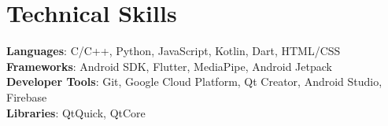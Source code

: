 \documentclass[letterpaper,11pt]{article}
\begin{document}
\section{Technical Skills}
 \begin{itemize}[leftmargin=0.15in, label={}]
    \small{\item{
     \textbf{Languages}{: C/C++, Python, JavaScript, Kotlin, Dart, HTML/CSS} \\
     \textbf{Frameworks}{: Android SDK, Flutter, MediaPipe, Android Jetpack} \\
     \textbf{Developer Tools}{: Git, Google Cloud Platform, Qt Creator, Android Studio, Firebase} \\
     \textbf{Libraries}{: QtQuick, QtCore}
    }}
 \end{itemize}


\end{document}
